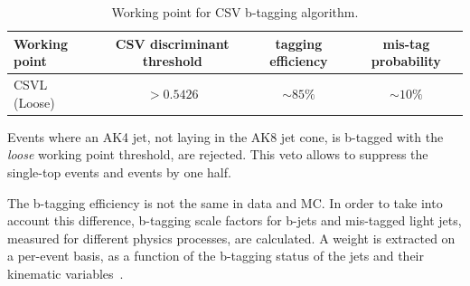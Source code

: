 % 

\begin{table}[!htb]
  \centering
  \label{tab:btag}
  \caption{Working point for CSV b-tagging algorithm.}
  \begin{tabular}{l|ccc}
     Working point & CSV discriminant threshold & tagging efficiency & mis-tag probability\\ 
    \hline
 \hline
     CSVL (Loose)  & $>0.5426$ & $\sim85\%$ & $\sim 10\%$  \\ 
  \end{tabular}

  
\end{table}

\noindent Events where an AK4 jet, not laying in the AK8 jet cone, is b-tagged with the \emph{loose} working point threshold, are rejected. This veto allows to suppress the single-top events and \ttbar events by one half.

\noindent The b-tagging efficiency is not the same in data and MC. In order to take into account this difference, b-tagging scale factors for b-jets and mis-tagged light jets, measured for different physics processes, are calculated. A weight is extracted on a per-event basis, as a function of the b-tagging status of the jets and their kinematic variables~\cite{bib:btagsf}.

